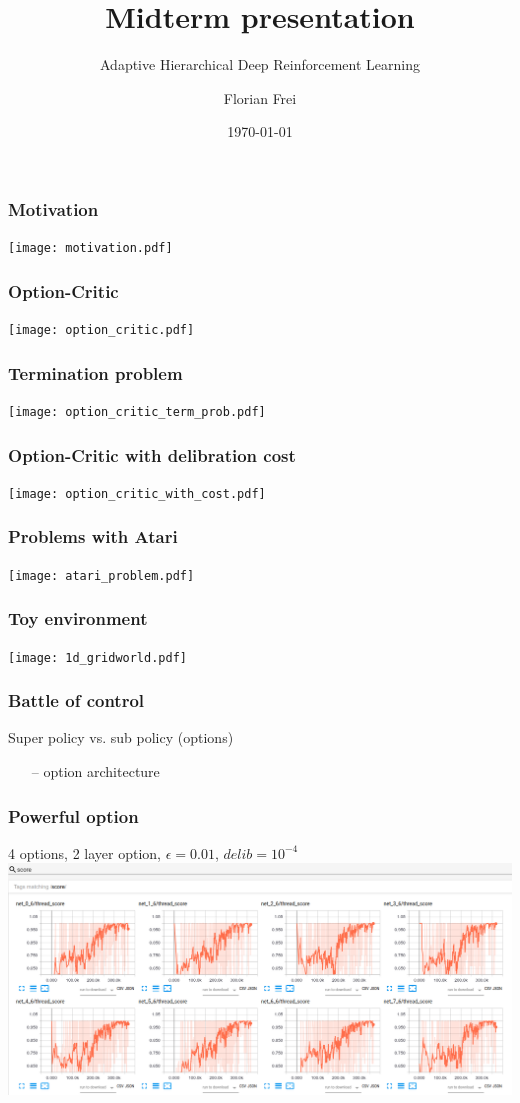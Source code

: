 \documentclass{beamer}
\author{Florian Frei} %
\date{\today} %
\begin{document}
\title{Midterm presentation}
\subtitle{Adaptive Hierarchical Deep Reinforcement Learning}
\begin{frame}
\titlepage
\end{frame}

\begin{frame}
\frametitle{Motivation}
\texttt{[image: motivation.pdf]}
\end{frame}

\begin{frame}
\frametitle{Option-Critic}
\texttt{[image: option\_critic.pdf]}
\end{frame}

\begin{frame}
\frametitle{Termination problem}
\texttt{[image: option\_critic\_term\_prob.pdf]}
\end{frame}

\begin{frame}
\frametitle{Option-Critic with delibration cost}
\texttt{[image: option\_critic\_with\_cost.pdf]}
\end{frame}

\begin{frame}
\frametitle{Problems with Atari}
\texttt{[image: atari\_problem.pdf]}
\end{frame}

\begin{frame}
\frametitle{Toy environment}
\texttt{[image: 1d\_gridworld.pdf]}
\end{frame}

\begin{frame}
\frametitle{Battle of control}
Super policy vs. sub policy (options)
\begin{itemize}
\item[--] option architecture
\end{itemize}
\end{frame}


\begin{frame}
\frametitle{Powerful option}
4 options, 2 layer option, $\epsilon = 0.01$, $delib = 10^{-4}$
\includegraphics[scale=0.2]{./strong/score.png}
\end{frame}
\end{document}

